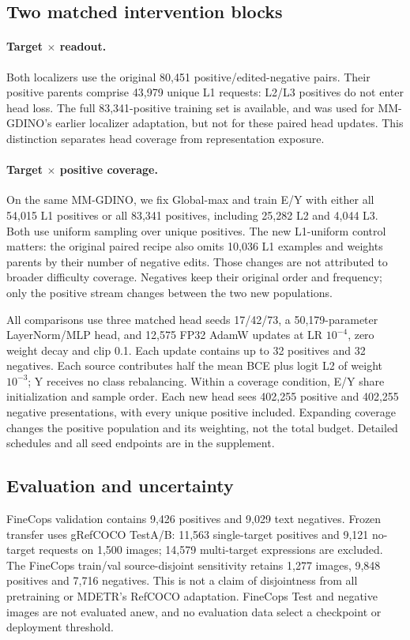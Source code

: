 \documentclass[10pt,twocolumn,letterpaper]{article}
\begin{document}
\subsection{Two matched intervention blocks}
\paragraph{Target $\times$ readout.}
Both localizers use the original 80,451 positive/edited-negative pairs.
Their positive parents comprise 43,979 unique L1 requests: L2/L3 positives
do not enter head loss. The full 83,341-positive training set is available,
and was used for MM-GDINO's earlier localizer adaptation, but not for these
paired head updates. This distinction separates head coverage from
representation exposure.

\paragraph{Target $\times$ positive coverage.}
On the same MM-GDINO, we fix Global-max and train E/Y with either all 54,015
L1 positives or all 83,341 positives, including 25,282 L2 and 4,044 L3.
Both use uniform sampling over unique positives. The new L1-uniform control
matters: the original paired recipe also omits 10,036 L1 examples and weights
parents by their number of negative edits. Those changes are not attributed
to broader difficulty coverage. Negatives keep their original order and
frequency; only the positive stream changes between the two new populations.

All comparisons use three matched head seeds 17/42/73, a 50,179-parameter
LayerNorm/MLP head, and 12,575 FP32 AdamW updates at LR $10^{-4}$, zero weight
decay and clip 0.1. Each update contains up to 32 positives and 32 negatives.
Each source contributes half the mean BCE plus logit L2 of weight $10^{-3}$;
Y receives no class rebalancing. Within a coverage condition, E/Y share
initialization and sample order. Each new head sees 402,255 positive and
402,255 negative presentations, with every unique positive included.
Expanding coverage changes the positive population and its weighting,
not the total budget. Detailed schedules and all seed endpoints are in
the supplement.

\subsection{Evaluation and uncertainty}
FineCops validation contains 9,426 positives and 9,029 text negatives.
Frozen transfer uses gRefCOCO TestA/B: 11,563 single-target positives and 9,121
no-target requests on 1,500 images; 14,579 multi-target expressions are excluded.
The FineCops train/val source-disjoint sensitivity retains 1,277 images,
9,848 positives and 7,716 negatives. This is not a claim of disjointness from
all pretraining or MDETR's RefCOCO adaptation. FineCops Test and negative
images are not evaluated anew, and no evaluation data select a checkpoint
or deployment threshold.
\end{document}
